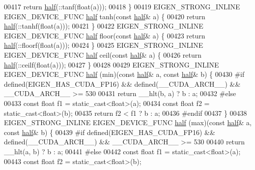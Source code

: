 \begin{DoxyCode}
00417   \textcolor{keywordflow}{return} \hyperlink{struct_eigen_1_1half}{half}(::tanf(\textcolor{keywordtype}{float}(a)));
00418 \}
00419 EIGEN\_STRONG\_INLINE EIGEN\_DEVICE\_FUNC \hyperlink{struct_eigen_1_1half}{half} tanh(\textcolor{keyword}{const} \hyperlink{struct_eigen_1_1half}{half}& a) \{
00420   \textcolor{keywordflow}{return} \hyperlink{struct_eigen_1_1half}{half}(::tanhf(\textcolor{keywordtype}{float}(a)));
00421 \}
00422 EIGEN\_STRONG\_INLINE EIGEN\_DEVICE\_FUNC \hyperlink{struct_eigen_1_1half}{half} floor(\textcolor{keyword}{const} \hyperlink{struct_eigen_1_1half}{half}& a) \{
00423   \textcolor{keywordflow}{return} \hyperlink{struct_eigen_1_1half}{half}(::floorf(\textcolor{keywordtype}{float}(a)));
00424 \}
00425 EIGEN\_STRONG\_INLINE EIGEN\_DEVICE\_FUNC \hyperlink{struct_eigen_1_1half}{half} ceil(\textcolor{keyword}{const} \hyperlink{struct_eigen_1_1half}{half}& a) \{
00426   \textcolor{keywordflow}{return} \hyperlink{struct_eigen_1_1half}{half}(::ceilf(\textcolor{keywordtype}{float}(a)));
00427 \}
00428 
00429 EIGEN\_STRONG\_INLINE EIGEN\_DEVICE\_FUNC \hyperlink{struct_eigen_1_1half}{half} (min)(\textcolor{keyword}{const} \hyperlink{struct_eigen_1_1half}{half}& a, \textcolor{keyword}{const} 
      \hyperlink{struct_eigen_1_1half}{half}& b) \{
00430 \textcolor{preprocessor}{#if defined(EIGEN\_HAS\_CUDA\_FP16) && defined(\_\_CUDA\_ARCH\_\_) && \_\_CUDA\_ARCH\_\_ >= 530}
00431   \textcolor{keywordflow}{return} \_\_hlt(b, a) ? b : a;
00432 \textcolor{preprocessor}{#else}
00433   \textcolor{keyword}{const} \textcolor{keywordtype}{float} f1 = \textcolor{keyword}{static\_cast<}\textcolor{keywordtype}{float}\textcolor{keyword}{>}(a);
00434   \textcolor{keyword}{const} \textcolor{keywordtype}{float} f2 = \textcolor{keyword}{static\_cast<}\textcolor{keywordtype}{float}\textcolor{keyword}{>}(b);
00435   \textcolor{keywordflow}{return} f2 < f1 ? b : a;
00436 \textcolor{preprocessor}{#endif}
00437 \}
00438 EIGEN\_STRONG\_INLINE EIGEN\_DEVICE\_FUNC \hyperlink{struct_eigen_1_1half}{half} (max)(\textcolor{keyword}{const} \hyperlink{struct_eigen_1_1half}{half}& a, \textcolor{keyword}{const} 
      \hyperlink{struct_eigen_1_1half}{half}& b) \{
00439 \textcolor{preprocessor}{#if defined(EIGEN\_HAS\_CUDA\_FP16) && defined(\_\_CUDA\_ARCH\_\_) && \_\_CUDA\_ARCH\_\_ >= 530}
00440   \textcolor{keywordflow}{return} \_\_hlt(a, b) ? b : a;
00441 \textcolor{preprocessor}{#else}
00442   \textcolor{keyword}{const} \textcolor{keywordtype}{float} f1 = \textcolor{keyword}{static\_cast<}\textcolor{keywordtype}{float}\textcolor{keyword}{>}(a);
00443   \textcolor{keyword}{const} \textcolor{keywordtype}{float} f2 = \textcolor{keyword}{static\_cast<}\textcolor{keywordtype}{float}\textcolor{keyword}{>}(b);

\end{DoxyCode}
